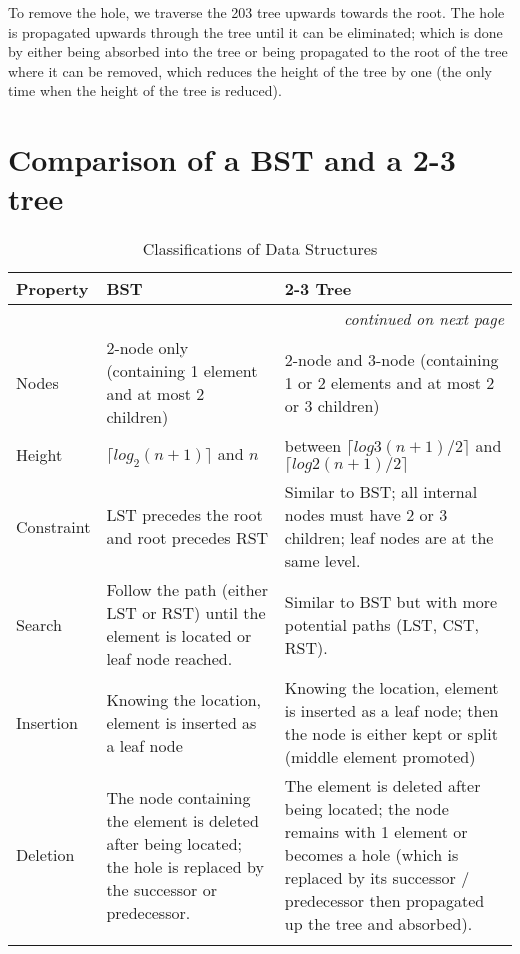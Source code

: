 To remove the hole, we traverse the 203 tree upwards towards the root. The hole is propagated upwards through the tree until it can be eliminated; which is done by either being absorbed into the tree or being propagated to the root of the tree where it can be removed, which reduces the height of the tree by one (the only time when the height of the tree is reduced). 

\section{Comparison of a BST and a 2-3 tree}
    
{\RaggedRight \centering
    \begin{longtable}{p{} p{} p{}}
    \textbf{Property} & \textbf{BST} & \textbf{2-3 Tree}\\
    \hline
    \hline
    \endhead

    \multicolumn{3}{r}{\footnotesize\itshape continued on next page}\\
    \endfoot 

    \endlastfoot

    Nodes & 2-node only (containing 1 element and at most 2 children) & 2-node and 3-node (containing 1 or 2 elements and at most 2 or 3 children)\\
    \hline
    Height & $\lceil log_2(n+1) \rceil$ and $n$ & between $\lceil log3 (n+1)/2 \rceil$ and $\lceil log2 (n+1)/2 \rceil$\\
    \hline
    Constraint & LST precedes the root and root precedes RST & Similar to BST; all internal nodes must have 2 or 3 children; leaf nodes are at the same level.\\
    \hline
    Search & Follow the path (either LST or RST) until the element is located or leaf node reached. & Similar to BST but with more potential paths (LST, CST, RST).\\
    \hline
    Insertion & Knowing the location, element is inserted as a leaf node & Knowing the location, element is inserted as a leaf node; then the node is either kept or split (middle element promoted)\\
    \hline
    Deletion & The node containing the element is deleted after being located; the hole is replaced by the successor or predecessor. & The element is deleted after being located; the node remains with 1 element or becomes a hole (which is replaced by its successor / predecessor then propagated up the tree and absorbed).\\
    \hline
    
    \caption{Classifications of Data Structures}
    \end{longtable}
} %

